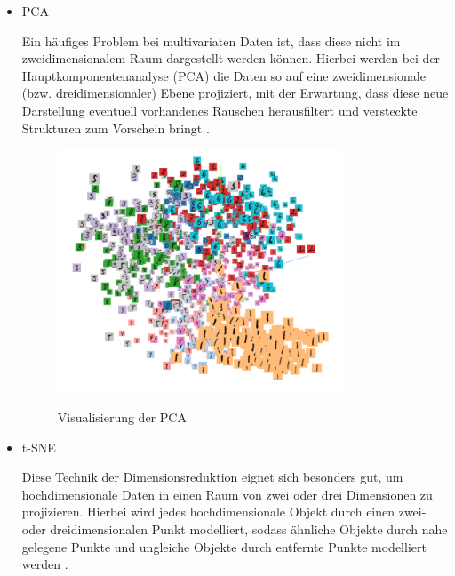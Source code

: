 \begin{itemize} 
\item \gls{PCA} \vspace{10pt}

Ein häufiges Problem bei multivariaten Daten ist, dass diese nicht im zweidimensionalem Raum dargestellt werden können.  Hierbei werden bei der Hauptkomponentenanalyse (PCA) die Daten so auf eine zweidimensionale (bzw. dreidimensionaler) Ebene projiziert, mit der Erwartung, dass diese neue Darstellung eventuell vorhandenes Rauschen herausfiltert und versteckte Strukturen zum Vorschein bringt \cite{pca}.
\begin{figure}[h!]
	\centering
	 \includegraphics[width=0.8\textwidth]{images/Kapitel_3/projektor_pca.png}\\
	\vspace{10pt} 
	\caption[Visualisierung der PCA]{Visualisierung der PCA} \vspace{0.7cm}
	\label{fig:pca}
\end{figure}



\item \gls{t-SNE} \vspace{10pt}

Diese Technik der Dimensionsreduktion eignet sich besonders gut, um hochdimensionale Daten in einen Raum von zwei oder drei Dimensionen zu projizieren. Hierbei wird jedes hochdimensionale Objekt durch einen zwei- oder dreidimensionalen Punkt modelliert, sodass ähnliche Objekte durch nahe gelegene Punkte und ungleiche Objekte durch entfernte Punkte modelliert werden \cite{t-sne}.



\end{itemize}
